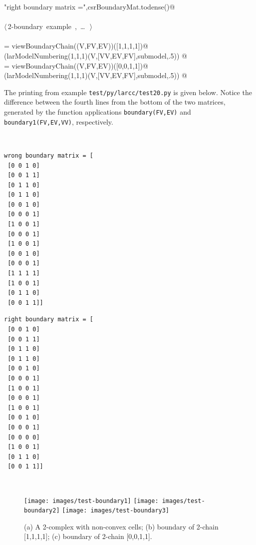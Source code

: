 \documentclass[11pt,oneside]{article}    %
\begin{document}
\begin{flushleft}
\begin{list}{}{}
\mbox{}\verb@print "right boundary matrix =",csrBoundaryMat.todense()@\\
\mbox{}\verb@@\\
\mbox{}\verb@@\hbox{$\langle\,$2-boundary example\nobreak\ {\footnotesize {}, \ldots\ }$\,\rangle$}\verb@@\\
\mbox{}\verb@@\\
\mbox{}\verb@submodel = viewBoundaryChain((V,FV,EV))([1,1,1,1])@\\
\mbox{}\verb@VIEW(larModelNumbering(1,1,1)(V,[VV,EV,FV],submodel,.5)) @\\
\mbox{}\verb@submodel = viewBoundaryChain((V,FV,EV))([0,0,1,1])@\\
\mbox{}\verb@VIEW(larModelNumbering(1,1,1)(V,[VV,EV,FV],submodel,.5)) @\\
\mbox{}\verb@@{\NWsep}
\end{list}
\vspace{-2ex}
\end{flushleft}

The printing from example \texttt{test/py/larcc/test20.py} is given below. Notice the difference between the fourth lines from the bottom of the two matrices, generated by the function applications \texttt{boundary(FV,EV)} and \texttt{boundary1(FV,EV,VV)}, respectively.

\vspace{2mm}
~\hfill
\begin{minipage}[c]{0.35\textwidth}
\centering\footnotesize
\begin{verbatim}
wrong boundary matrix = [
 [0 0 1 0]
 [0 0 1 1]
 [0 1 1 0]
 [0 1 1 0]
 [0 0 1 0]
 [0 0 0 1]
 [1 0 0 1]
 [0 0 0 1]
 [1 0 0 1]
 [0 0 1 0]
 [0 0 0 1]
 [1 1 1 1]
 [1 0 0 1]
 [0 1 1 0]
 [0 0 1 1]]
\end{verbatim}
\end{minipage}
\hfill
\begin{minipage}[c]{0.35\textwidth}
\centering\footnotesize
\begin{verbatim}
right boundary matrix = [
 [0 0 1 0]
 [0 0 1 1]
 [0 1 1 0]
 [0 1 1 0]
 [0 0 1 0]
 [0 0 0 1]
 [1 0 0 1]
 [0 0 0 1]
 [1 0 0 1]
 [0 0 1 0]
 [0 0 0 1]
 [0 0 0 0]
 [1 0 0 1]
 [0 1 1 0]
 [0 0 1 1]]
\end{verbatim}
\end{minipage}
\hfill~


\begin{figure}[htbp] %
   \centering
   \texttt{[image: images/test-boundary1]} 
   \texttt{[image: images/test-boundary2]} 
   \texttt{[image: images/test-boundary3]} 
   \caption{(a) A 2-complex with non-convex cells; (b) boundary of 2-chain [1,1,1,1]; (c) boundary of 2-chain [0,0,1,1].}
   \label{fig:example}
\end{figure}
\end{document}
